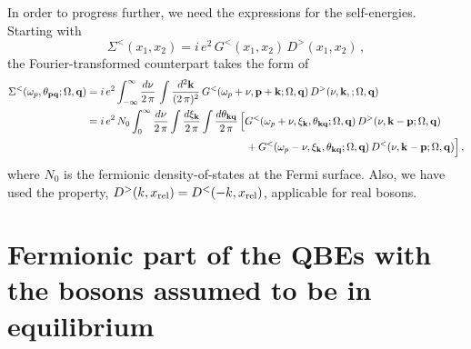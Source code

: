 \documentclass[aps, prb, onecolumn, nofootinbib, citeautoscript, 10pt]{revtex4-2}
\def \nn{\nonumber \\}
\newcommand{\bk}{\mathbf{k}}
\newcommand{\bp}{\mathbf{p}}
\newcommand{\bq}{\mathbf{q}}
\begin{document}
In order to progress further, we need the expressions for the self-energies. Starting with
$$
\Sigma^<(x_1,x_2)  = i\, e^2\, G^<(x_1,x_2) \, D^>(x_1,x_2)\,, $$
the Fourier-transformed counterpart takes the form of
\begin{align}
	\Sigma^< ( \omega_p, \theta_{\bp \bq}; \Omega, \bq)  & = 
	i\, e^2 \int_{-\infty}^{\infty} \frac{d\nu} { 2 \, \pi }\,
	\int\frac{d^2 \bk}   {( 2 \, \pi )^2} \, 
	G^<( \omega_p +\nu, \bp + \bk  ;\Omega, \bq) 
	\, D^>(\nu ,\bk,;\Omega, \bq)
	\nn & = i \,e^2\, N_0 \int_{0}^{\infty} \frac{d\nu}{ 2 \, \pi }
	\int \frac{d\xi_{\bk}}{ 2 \, \pi } 
	\int \frac{d\theta_{\bk \bq}}  { 2 \, \pi } \,\Big[
	G^<( \omega_p +\nu  ,\xi_{\bk}, \theta_{\bk \bq} ; \Omega, \bq) \, 
	D^>( \nu , \bk-\bp ;  \Omega, \bq )
	\nn & \hspace{ 5.35 cm }
	+ G^<( \omega_p  - \nu  ,\xi_{\bk}, \theta_{\bk \bq} ; \Omega, \bq ) \, 
	D^<( \nu , \bk-\bp;  \Omega, \bq ) \Big ]\,,
	\label{sigma-eq2}
\end{align}
where $N_0$ is the fermionic density-of-states at the Fermi surface. Also, we have used the property, $D^>( k, x_{\rm rel}) =
D^<(- k, x_{\rm rel})$, applicable for real bosons. 


\section{Fermionic part of the QBEs with the bosons assumed to be in equilibrium}
\label{appfer0}
\end{document}
